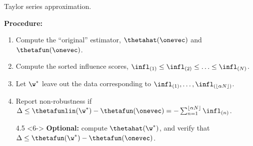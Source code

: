 \begin{frame}{Taylor series approximation.}

\textbf{Procedure:}

\begin{enumerate}
    \item<2-> Compute the ``original'' estimator, $\thetahat(\onevec)$ and
    $\thetafun(\onevec)$.
    \item<3-> Compute the sorted influence scores,
        $\infl_{(1)} \le \infl_{(2)} \le \ldots \le \infl_{(N)}$.
    \item<4-> Let $\w^*$ leave out the data corresponding to
    $\infl_{(1)},  \ldots , \infl_{(\lfloor \alpha N \rfloor)}$.
    \item<5-> Report non-robustness if
        $ \Delta \le \thetafunlin(\w^*) - \thetafun(\onevec)  =
            - \sum_{n=1}^{\lfloor \alpha N \rfloor} \infl_{(n)}$.
    \item[4.5]<6-> \textbf{Optional: } compute $\thetahat(\w^*)$, and verify
    that $\Delta \le \thetafun(\w^*) - \thetafun(\onevec)$.
\end{enumerate}






\end{frame}
